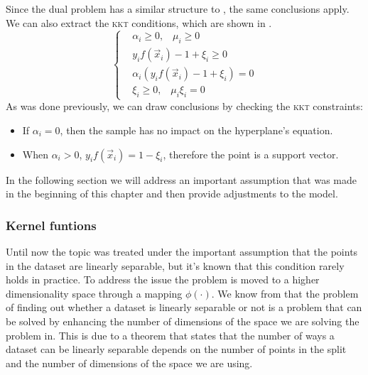 Since the dual problem has a similar structure to , the same conclusions apply. We can
also extract the \textsc{kkt} conditions, which are shown in .
\begin{equation}
	\label{eq:sm-kkt}
	\begin{cases}
		& \alpha_i \geq 0, \hspace{10pt}\mu_i \geq 0 \\
		 & y_if(\vec{x}_i) - 1 + \xi_i \geq 0 \\
		 & \alpha_i(y_if(\vec{x}_i) - 1 + \xi_i) = 0 \\
		 & \xi_i \geq 0, \hspace{10pt} \mu_i\xi_i = 0
	\end{cases}
\end{equation}
As was done previously, we can draw conclusions by checking the \textsc{kkt} constraints:
\begin{itemize}
	\item If $\alpha_i = 0$, then the sample has no impact on the hyperplane's equation.
	\item When $\alpha_i > 0$, $y_if(\vec{x}_i) = 1 - \xi_i$, therefore the point is a
		support vector.
\end{itemize}

In the following section we will address an important assumption that was made in the beginning of
this chapter and then provide adjustments to the model.

\subsubsection{Kernel funtions}
\label{sssec:kernel-functions}
Until now the topic was treated under the important assumption that the points in the dataset are
linearly separable, but it's known that this condition rarely holds in practice. To address the issue the
problem is moved to a higher dimensionality space through a mapping $\phi(\cdot)$. We know from
\cite{cover1965} that the problem of finding out whether a dataset is linearly separable or not is a
problem that can be solved by enhancing the number of dimensions of the space we are solving the
problem in. This is due to a theorem that states that the number of ways a dataset can be linearly
separable depends on the number of points in the split and the number of dimensions of the space we
are using.


